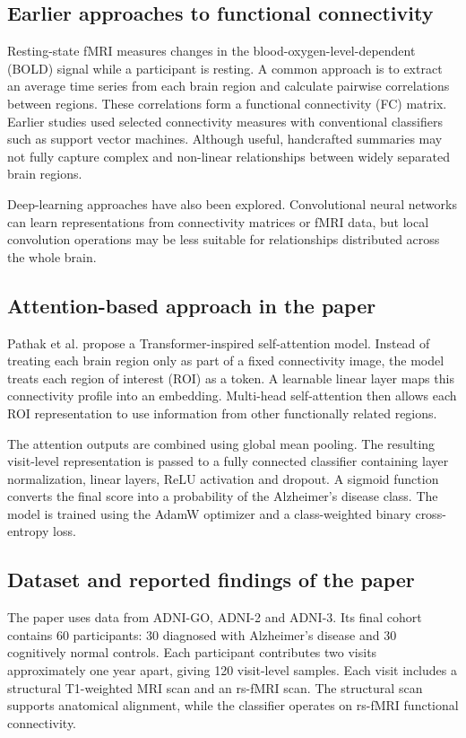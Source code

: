 \documentclass[11pt,a4paper]{article}
\begin{document}
\subsection{Earlier approaches to functional connectivity}
Resting-state fMRI measures changes in the blood-oxygen-level-dependent (BOLD) signal while a participant is resting. A common approach is to extract an average time series from each brain region and calculate pairwise correlations between regions. These correlations form a functional connectivity (FC) matrix. Earlier studies used selected connectivity measures with conventional classifiers such as support vector machines. Although useful, handcrafted summaries may not fully capture complex and non-linear relationships between widely separated brain regions.

Deep-learning approaches have also been explored. Convolutional neural networks can learn representations from connectivity matrices or fMRI data, but local convolution operations may be less suitable for relationships distributed across the whole brain.

\subsection{Attention-based approach in the paper}
Pathak et al. propose a Transformer-inspired self-attention model. Instead of treating each brain region only as part of a fixed connectivity image, the model treats each region of interest (ROI) as a token. A learnable linear layer maps this connectivity profile into an embedding. Multi-head self-attention then allows each ROI representation to use information from other functionally related regions.

The attention outputs are combined using global mean pooling. The resulting visit-level representation is passed to a fully connected classifier containing layer normalization, linear layers, ReLU activation and dropout. A sigmoid function converts the final score into a probability of the Alzheimer's disease class. The model is trained using the AdamW optimizer and a class-weighted binary cross-entropy loss.

\subsection{Dataset and reported findings of the paper}
The paper uses data from ADNI-GO, ADNI-2 and ADNI-3. Its final cohort contains 60 participants: 30 diagnosed with Alzheimer's disease and 30 cognitively normal controls. Each participant contributes two visits approximately one year apart, giving 120 visit-level samples. Each visit includes a structural T1-weighted MRI scan and an rs-fMRI scan. The structural scan supports anatomical alignment, while the classifier operates on rs-fMRI functional connectivity.
\end{document}
